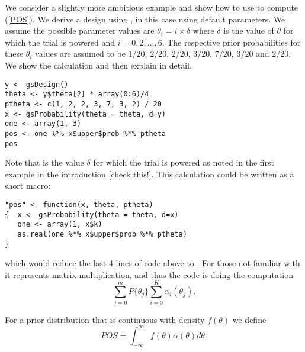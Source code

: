 We consider a slightly more ambitious example and show how to use  to compute (\ref{POS}). 
We derive a design using , in this case using default parameters. 
We assume the possible parameter values are $\theta_i = i \times \delta$ where $\delta$ is the value of $\theta$ for which the trial is powered and $i=0,2,\ldots,6$. 
The respective prior probabilities for these $\theta_i$ values are assumed to be $1/20$, $2/20$, $2/20$, $3/20$, $7/20$, $3/20$ and $2/20$.
We show the calculation and then explain in detail.
\begin{verbatim}
y <- gsDesign()
theta <- y$theta[2] * array(0:6)/4
ptheta <- c(1, 2, 2, 3, 7, 3, 2) / 20
x <- gsProbability(theta = theta, d=y)
one <- array(1, 3)
pos <- one %*% x$upper$prob %*% ptheta
pos
\end{verbatim}
Note that  is the value $\delta$ for which the trial is powered as noted in the first example in the introduction [check this!]. 
This calculation could be written as a short macro:

\begin{verbatim}
"pos" <- function(x, theta, ptheta)
{  x <- gsProbability(theta = theta, d=x)
   one <- array(1, x$k)
   as.real(one %*% x$upper$prob %*% ptheta)
}    
\end{verbatim}
which would reduce the last 4 lines of code above to .
For those not familiar with it \code{\%*\%} represents matrix multiplication, and thus the code  is doing the computation
$$\sum_{j=0}^m P\{\theta_j\} \sum_{i=0}^K \alpha_i(\theta_j).$$

For a prior distribution that is continuous with density $f(\theta)$ we define
\begin{equation}
POS=\int_{-\infty}^\infty f(\theta) \alpha(\theta)d\theta.\label{POSc}
\end{equation}

